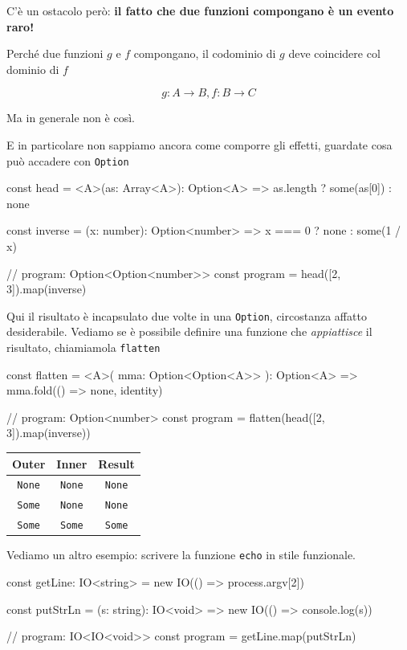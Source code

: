 \documentclass[12pt]{article}
\theoremstyle{definition}
\newenvironment{code}
  {\vspace{0.5cm} \VerbatimEnvironment\begin{typescriptcode}}
  {\end{typescriptcode} \vspace{0.2cm}}
\begin{document}
C'è un ostacolo però: \textbf{il fatto che due funzioni compongano è un evento raro!}

Perché due funzioni $g$ e $f$ compongano, il codominio di $g$ deve coincidere col dominio di $f$

$$
g: A \rightarrow B, f: B \rightarrow C
$$

Ma in generale non è così.

E in particolare non sappiamo ancora come comporre gli effetti, guardate cosa può accadere con \texttt{Option}

\begin{code}
const head = <A>(as: Array<A>): Option<A> =>
  as.length ? some(as[0]) : none

const inverse = (x: number): Option<number> =>
  x === 0 ? none : some(1 / x)

// program: Option<Option<number>>
const program = head([2, 3]).map(inverse)
\end{code}

Qui il risultato è incapsulato due volte in una \texttt{Option}, circostanza affatto desiderabile.
Vediamo se è possibile definire una funzione che \emph{appiattisce} il risultato, chiamiamola \texttt{flatten}

\begin{code}
const flatten = <A>(
  mma: Option<Option<A>>
): Option<A> => mma.fold(() => none, identity)

// program: Option<number>
const program = flatten(head([2, 3]).map(inverse))
\end{code}

\begin{center}
\begin{tabular}{ c c c }
 Outer & Inner & Result \\
 \hline
 \texttt{None} & \texttt{None} & \texttt{None} \\
 \texttt{Some} & \texttt{None} & \texttt{None} \\
 \texttt{Some} & \texttt{Some} & \texttt{Some}
\end{tabular}
\end{center}

Vediamo un altro esempio: scrivere la funzione \texttt{echo} in stile funzionale.

\begin{code}
const getLine: IO<string> = new IO(() => process.argv[2])

const putStrLn = (s: string): IO<void> =>
  new IO(() => console.log(s))

// program: IO<IO<void>>
const program = getLine.map(putStrLn)
\end{code}
\end{document}
